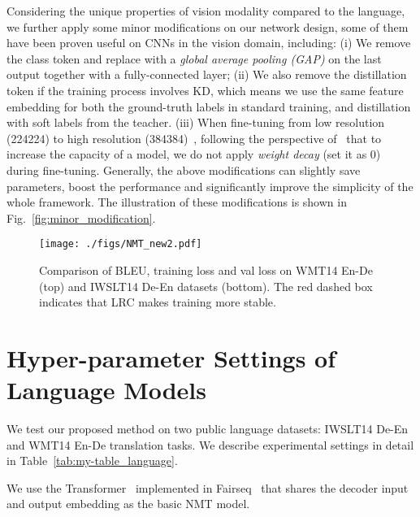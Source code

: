\documentclass[runningheads]{llncs}
\begin{document}
	 Considering the unique properties of vision modality compared to the language, we further apply some minor modifications on our network design, some of them have been proven useful on CNNs in the vision domain, including: (i) We remove the class token and replace with a {\em global average pooling (GAP)} on the last output together with a fully-connected layer; (ii) We also remove the distillation token if the training process involves KD, which means we use the same feature embedding for both the ground-truth labels in standard training, and distillation with soft labels from the teacher. (iii) When fine-tuning from low resolution (224224) to high resolution (384384)~\cite{touvron2020training}, following the perspective of~\cite{shen2020meal} that to increase the capacity of a model, we do not apply {\em weight decay} (set it as 0) during fine-tuning. Generally, the above modifications can slightly save parameters, boost the performance and significantly improve the simplicity of the whole framework. The illustration of these modifications is shown in Fig.~\ref{fig:minor_modification}.
	
	\begin{figure*}[h]
		\centering \vspace{-0.2in}
		\texttt{[image: ./figs/NMT\_new2.pdf]}
		\caption{Comparison of BLEU, training loss and val loss on WMT14 En-De (top) and IWSLT14 De-En  datasets (bottom). The red dashed box indicates that LRC makes training more stable.}
		\label{fig:NMT_results_full}
	\end{figure*}
	
	\section{Hyper-parameter Settings of Language Models} \label{details_language}
	We test our proposed method on two public language datasets: IWSLT14 De-En and WMT14 En-De translation tasks. We  describe experimental settings in detail in Table~\ref{tab:my-table_language}.
	
	 We use the Transformer~\cite{vaswani2017attention} implemented in Fairseq~\cite{fair_sque} that shares the decoder input and output embedding as the basic NMT model.
	
\end{document}
